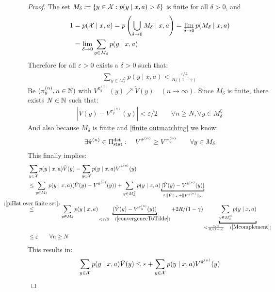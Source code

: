 \begin{proof}
	The set \(M_\delta\coloneqq \{y\in\mathcal{X} : p(y\mid x,a)>\delta \} \) is finite for all \(\delta>0\), and
	\begin{align*}
		1&=p(\mathcal{X}\mid x,a)=p\left(\bigcup_{\delta \to 0} M_\delta \mid x, a \right)
		= \lim_{\delta\to 0} p(M_\delta\mid x,a) \\
		&=\lim_{\delta\to 0} \sum_{y\in M_\delta} p(y\mid x,a)
	\end{align*}
	Therefore for all \(\varepsilon >0\) exists a \(\delta>0\) such that:
	\begin{align}
		\sum_{y\in M_\delta^\complement}p(y\mid x,a) < \frac{\varepsilon /4}{R/(1-\gamma)}
		\label{Mcomplement}
	\end{align}
	Be \((\pi_y^{(n)},n\in\mathbb{N} )\) with \(V^{\pi_y^{(n)}}(y) \nearrow \tilde{V}(y) \quad (n\to\infty) \). Since \(M_\delta\) is finite, there exists \(N\in\mathbb{N} \) such that:
	\begin{align}
		|\tilde{V}(y) -V^{\pi_y^{(n)}}(y)|< \varepsilon/2
		\qquad \forall n\ge N, \forall y\in M_\delta^\complement
		\label{convergenceToTilde}
	\end{align}
	And also because \(M_\delta \) is finite and \ref{finite outmatching} we know:
	\begin{align}
	\exists\hat{\pi}^{(n)}\in\Pi_{\textnormal{stat}}^{\textnormal{det}} : 
	\quad {V^{\hat{\pi}^{(n)}}\ge V^{\pi_y^{(n)}}}
	\qquad \forall y\in M_\delta
	\label{piHat over finite set}
	\end{align}
	This finally implies:
	\begin{align*}
		&\sum_{y\in\cX}p(y\mid x,a)\tilde{V}(y) 
		- \sum_{y\in\cX}p(y\mid x,a) V^{\hat{\pi}^{(n)}}(y) \\
		&\le \sum_{y\in M_\delta}p(y\mid x,a) (\tilde{V}(y) - V^{\hat{\pi}^{(n)}}(y))
		+ \sum_{y\in M_\delta^\complement}p(y\mid x,a) 
		\underbracket{|\tilde{V}(y) - V^{\hat{\pi}^{(n)}}(y)|}_{
			\le \|\tilde{V}\|_\infty + \| V^{\hat{\pi}^{(n)}}\|_\infty
		} \\
		&\lxlq{(\ref{piHat over finite set})} \sum_{y\in M_\delta}p(y\mid x,a) 
		\underbracket{(\tilde{V}(y) - V^{\pi_y^{(n)}}(y))}_{
			<\varepsilon/2\quad(\ref{convergenceToTilde})
		}
		+ 2R/(1-\gamma) \underbracket{\sum_{y\in M_\delta^\complement}p(y\mid x,a)}_{
			< \frac{\varepsilon /4}{R/(1-\gamma)}\quad(\ref{Mcomplement})
		}\\
		&\le \varepsilon \qquad \forall n\ge N
	\end{align*}
	This results in:
	\begin{align*}
		\sum_{y\in\cX}p(y\mid x,a)\tilde{V}(y) 
		&\le \varepsilon + \sum_{y\in\cX}p(y\mid x,a) V^{\hat{\pi}^{(n)}}(y) \\

\end{align*}
\end{proof}
